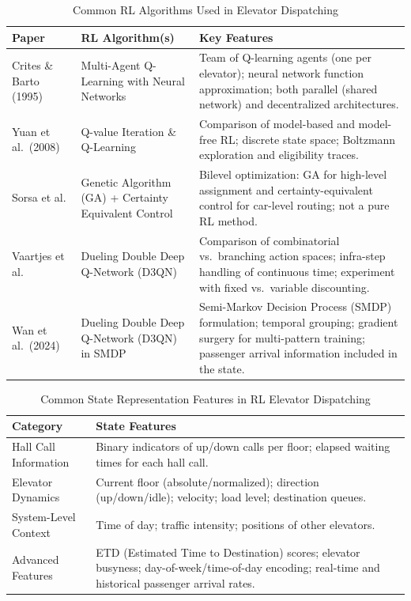 \documentclass[10pt,twocolumn]{article}
\begin{document}
\begin{table}[h!]
\centering
\caption{Common RL Algorithms Used in Elevator Dispatching}
\label{tab:rl-algorithms}
\begin{tabular}{|l|p{4cm}|p{8cm}|}
\hline
\textbf{Paper} & \textbf{RL Algorithm(s)} & \textbf{Key Features} \\
\hline
Crites \& Barto (1995) & Multi-Agent Q-Learning with Neural Networks &
Team of Q-learning agents (one per elevator); neural network function approximation; both parallel (shared network) and decentralized architectures\cite{CRITES1995}. \\
\hline
Yuan et al.\ (2008) & Q-value Iteration \& Q-Learning &
Comparison of model-based and model-free RL; discrete state space; Boltzmann exploration and eligibility traces\cite{YUAN2008}. \\
\hline
Sorsa et al. & Genetic Algorithm (GA) + Certainty Equivalent Control &
Bilevel optimization: GA for high-level assignment and certainty-equivalent control for car-level routing; not a pure RL method\cite{SORSA2009}. \\
\hline
Vaartjes et al. & Dueling Double Deep Q-Network (D3QN) &
Comparison of combinatorial vs.\ branching action spaces; infra-step handling of continuous time; experiment with fixed vs.\ variable discounting\cite{VAARTJES2025}. \\
\hline
Wan et al.\ (2024) & Dueling Double Deep Q-Network (D3QN) in SMDP &
Semi-Markov Decision Process (SMDP) formulation; temporal grouping; gradient surgery for multi-pattern training; passenger arrival information included in the state\cite{WAN2024}. \\
\hline
\end{tabular}
\end{table}

\begin{table}[h!]
\centering
\caption{Common State Representation Features in RL Elevator Dispatching}
\label{tab:state-repr}
\begin{tabular}{|l|p{10cm}|}
\hline
\textbf{Category} & \textbf{State Features} \\
\hline
Hall Call Information &
Binary indicators of up/down calls per floor; elapsed waiting times for each hall call. \\
\hline
Elevator Dynamics &
Current floor (absolute/normalized); direction (up/down/idle); velocity; load level; destination queues. \\
\hline
System-Level Context &
Time of day; traffic intensity; positions of other elevators. \\
\hline
Advanced Features &
ETD (Estimated Time to Destination) scores; elevator busyness; day-of-week/time-of-day encoding; real-time and historical passenger arrival rates. \\
\hline
\end{tabular}
\end{table}
\end{document}
